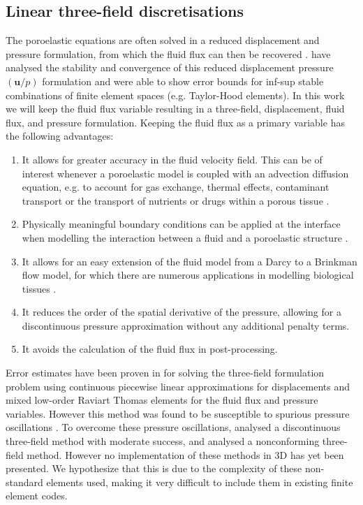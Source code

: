 \subsection{Linear three-field discretisations}
The poroelastic equations are often solved in a reduced displacement and pressure formulation, from which the fluid flux can then be recovered \citep{murad1994stability,white2008stabilized}. \citet{murad1994stability} have analysed the stability and convergence of this reduced displacement pressure $(\boldsymbol{u}/ p)$ formulation and were able to show error bounds for inf-sup stable combinations of finite element spaces (e.g. Taylor-Hood elements). In this work we will keep the fluid flux variable resulting in a three-field, displacement, fluid flux, and pressure formulation. Keeping the fluid flux as a primary variable has the following advantages:
\begin{enumerate}[label=\roman*]
 \item It allows for greater accuracy in the fluid velocity field. This can be of interest whenever a poroelastic model is coupled with an advection diffusion equation, e.g. to account for gas exchange, thermal effects, contaminant transport or the transport of nutrients or drugs within a porous tissue \citep{khaled2003role}.
 \item Physically meaningful boundary conditions can be applied at the interface when modelling the interaction between a fluid and a poroelastic structure \citep{badia2009coupling}.
 \item It allows for an easy extension of the fluid model from a Darcy to a Brinkman flow model, for which there are numerous applications in modelling biological tissues \citep{khaled2003role}.
 \item It reduces the order of the spatial derivative of the pressure, allowing for a discontinuous pressure approximation without any additional penalty terms.
  \item It avoids the calculation of the fluid flux in post-processing. 
\end{enumerate}
 Error estimates have been proven in \citet{phillips2007coupling,phillips2007couplingtwo} for solving the three-field formulation problem using continuous piecewise linear approximations for displacements and mixed low-order Raviart Thomas elements for the fluid flux and pressure variables. However this method was found to be susceptible to spurious pressure oscillations \citep{phillips2009overcoming}. To overcome these pressure oscillations, \citet{li2012discontinuous} analysed a discontinuous three-field method with moderate success, and \citet{yi2013coupling} analysed a nonconforming three-field method. However no implementation of these methods in 3D has yet been presented. We hypothesize that this is due to the complexity of these non-standard elements used, making it very difficult to include them in existing finite element codes.


